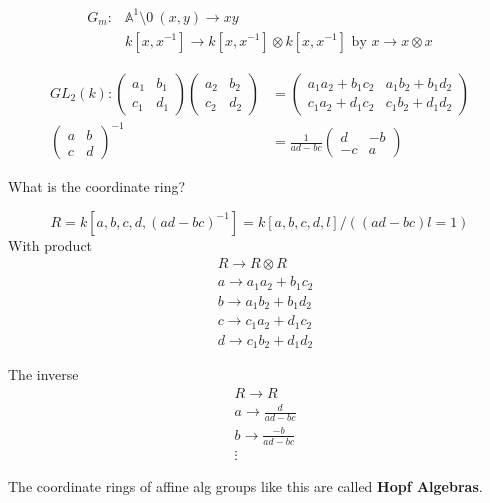 \begin{example}
    \begin{align*}
        G_m\colon & \mathbb{A}^1\setminus 0 \ (x,y)\rightarrow xy\\
        &k[x,x^{-1}] \rightarrow k[x,x^{-1}]\otimes k[x,x^{-1}] \text{ by }x\rightarrow x\otimes x
    \end{align*} 
\end{example}

\begin{example}
    \begin{align*}GL_2(k)\colon \begin{pmatrix}
        a_1 & b_1\\
        c_1 & d_1
    \end{pmatrix}\begin{pmatrix}
        a_2 & b_2\\
        c_2 & d_2
    \end{pmatrix}&=\begin{pmatrix}
        a_1a_2+b_1c_2 & a_1b_2+b_1d_2\\
        c_1a_2+d_1c_2 & c_1b_2+d_1d_2
    \end{pmatrix}\\
    \begin{pmatrix}
        a&b\\
        c&d
    \end{pmatrix}^{-1} &= \frac{1}{ad-bc}\begin{pmatrix}
        d&-b\\
        -c&a
    \end{pmatrix}
\end{align*}

What is the coordinate ring?

\[R = k[a,b,c,d, (ad-bc)^{-1}] = k[a,b,c,d,l]/((ad-bc)l = 1) \]
With product \begin{align*}
    &R\rightarrow R\otimes R\\
    & a \rightarrow a_1a_2+b_1c_2\\
    & b\rightarrow a_1b_2+b_1d_2\\
    & c \rightarrow c_1a_2+d_1c_2\\
    & d\rightarrow c_1b_2+d_1d_2
\end{align*}

The inverse \begin{align*}
    &R\rightarrow R\\
    & a\rightarrow \frac{d}{ad-bc}\\
    & b\rightarrow \frac{-b}{ad-bc}\\
    &\vdots
\end{align*}

The coordinate rings of affine alg groups like this are called \textbf{Hopf Algebras}.
\end{example}

